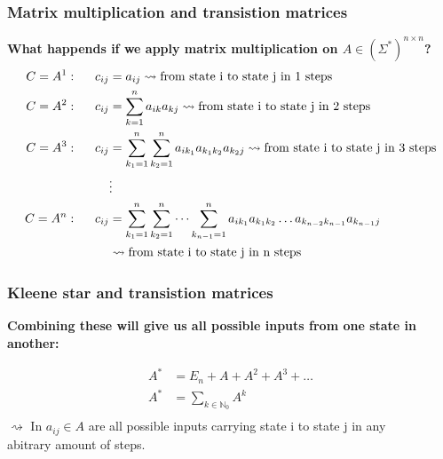\documentclass{beamer}
\begin{document}
\begin{frame}
  \frametitle{Matrix multiplication and transistion matrices}
  {\bf What happends if we apply matrix multiplication on 
  $A \in (\Sigma^*)^{n \times n}$?}
  \begin{equation*}
    \begin{aligned}
      C = A^1: \hspace{0.5cm} c_{ij} &= a_{ij}
      \rightsquigarrow 
      \text{from state i to state j in 1 steps}\\
      C = A^2: \hspace{0.5cm} c_{ij} &= \sum_{k=1}^{n} a_{ik}a_{kj}
      \rightsquigarrow 
      \text{from state i to state j in 2 steps}\\
      C = A^3: \hspace{0.5cm} c_{ij} &= \sum_{k_1=1}^{n}
      \sum_{k_2=1}^{n}a_{ik_1}a_{k_1k_2}a_{k_2j} \rightsquigarrow 
      \text{from state i to state j in 3 steps}\\ 
                          &\vdots\\
      C = A^n: \hspace{0.5cm} c_{ij} &= \sum_{k_1=1}^{n}
      \sum_{k_2=1}^{n}\dots \sum_{k_{n-1}=1}^n 
      a_{ik_1}a_{k_1k_2}\dots a_{k_{n-2}k_{n-1}}a_{k_{n-1}j} \\
        &\rightsquigarrow \text{from state i to state j in n steps}\\ 
    \end{aligned}
  \end{equation*}
\end{frame}

\begin{frame}
  \frametitle{Kleene star and transistion matrices}
  {
    \bf Combining these will give us all possible 
    inputs from one state in another:
  }

  \begin{equation*}
    \begin{aligned}
      A^* &= E_n + A + A^2 + A^3+ \dots \\
      A^* &= \sum_{k \in \mathbb{N}_0} A^k\\
    \end{aligned}
  \end{equation*}
  $\rightsquigarrow \text{ In } a_{ij} \in A$ are all possible inputs
   carrying state i to state j in any \\
   \hspace{0.5cm} abitrary amount of steps.
\end{frame}
\end{document}
